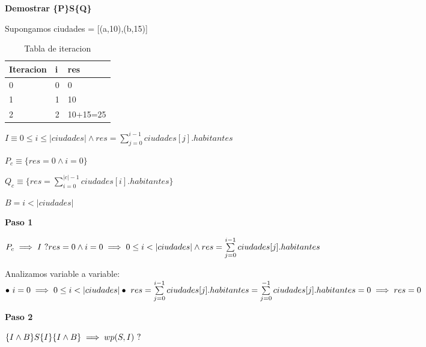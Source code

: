 \documentclass[10pt,a4paper]{article}
\begin{document}
\vspace{0.3cm}

\textbf{Demostrar \{P\}S\{Q\}}

\vspace{0.1cm}

\noindent Supongamos ciudades = [(a,10),(b,15)]

\begin{table}[h!]
	\begin{tabular}{| l | l | l |} 
		\hline
		Iteracion & i & res  \\ [0.5ex] 
		\hline
		0 & 0 & 0 \\ 
		1 & 1 & 10 \\
		2 & 2 & 10+15=25 \\
		\hline
	\end{tabular}
	\captionsetup{singlelinecheck=off}
	\caption{Tabla de iteracion}
	\label{tab:iteracion}
\end{table}

$I \equiv 0 \leq i \leq |ciudades| \wedge res = \sum\limits_{j=0}^{i-1} ciudades[j].habitantes$

$ P_c \equiv \{res = 0 \wedge i = 0\}$

$ Q_c \equiv \{res = \sum\limits_{i=0}^{|c|-1} ciudades[i].habitantes\}$

$ B = i < |ciudades|$

\vspace{0.3cm}

\textbf{Paso 1}

\vspace{0.1cm}

\noindent$P_c \implies I \ ? \\ res = 0 \wedge i = 0 \implies 0 \leq i < |ciudades| \wedge res = \sum\limits_{j=0}^{i-1} ciudades[j].habitantes$

Analizamos variable a variable: \\ $\bullet \ i = 0 \implies 0 \leq i < |ciudades| \\ \bullet \ res = \sum\limits_{j=0}^{i-1} ciudades[j].habitantes = \sum\limits_{j=0}^{-1} ciudades[j].habitantes = 0 \implies res = 0 $

\vspace{0.3cm}

\textbf{Paso 2}

\vspace{0.1cm}

\noindent$\{I \wedge B\} S \{I\} \\ \{I \wedge B\} \implies wp(S,I) \ ?$
\end{document}
